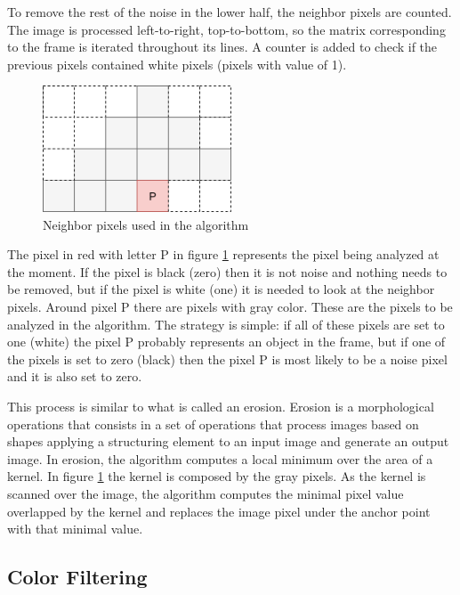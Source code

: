 To remove the rest of the noise in the lower half, the neighbor pixels are counted. The image is processed left-to-right, top-to-bottom, so the matrix corresponding to the frame is iterated throughout its lines. A counter is added to check if the previous pixels contained white pixels (pixels with value of 1). 

\begin{figure}[htp]
	
	\centering
	\includegraphics[width=0.5\textwidth]{capcalib/imgs/neighbor_count.png}
	
	\caption{Neighbor pixels used in the algorithm}
	\label{fig:neigh_cnt}
	
\end{figure}

The pixel in red with letter P in figure \ref{fig:neigh_cnt} represents the pixel being analyzed at the moment. If the pixel is black (zero) then it is not noise and nothing needs to be removed, but if the pixel is white (one) it is needed to look at the neighbor pixels. Around pixel P there are pixels with gray color. These are the pixels to be analyzed in the algorithm. The strategy is simple: if all of these pixels are set to one (white) the pixel P probably represents an object in the frame, but if one of the pixels is set to zero (black) then the pixel P is most likely to be a noise pixel and it is also set to zero.

This process is similar to what is called an erosion. Erosion is a morphological operations that consists in a set of operations that process images based on shapes applying a structuring element to an input image and generate an output image. In erosion, the algorithm computes a local minimum over the area of a kernel. In figure \ref{fig:neigh_cnt} the kernel is composed by the gray pixels. As the kernel is scanned over the image, the algorithm computes the minimal pixel value overlapped by the kernel and replaces the image pixel under the anchor point with that minimal value. \cite{OpenCV2.4.13.6documentation} 

\subsection{Color Filtering}

